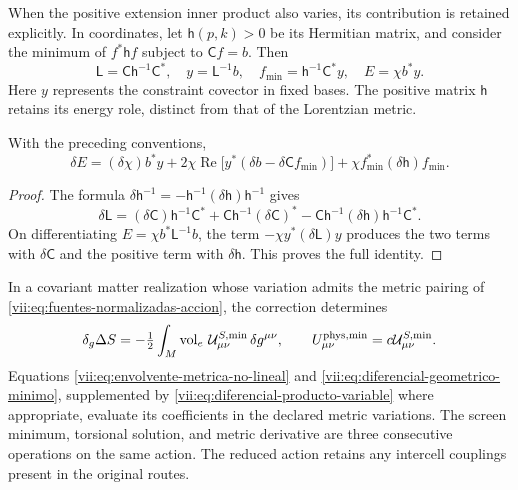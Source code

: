 When the positive extension inner product also varies, its
contribution is retained explicitly. In coordinates, let
\(\mathsf h(p,k)>0\) be its Hermitian matrix, and consider the
minimum of \(f^*\mathsf h f\) subject to \(\mathsf C f=b\). Then
\begin{equation}
 \mathsf L=\mathsf C\mathsf h^{-1}\mathsf C^*,\quad
 y=\mathsf L^{-1}b,\quad
 f_{\min}=\mathsf h^{-1}\mathsf C^*y,\quad
 E=\chi b^*y.
 \label{vii:eq:minimo-producto-variable}
\end{equation}
Here \(y\) represents the constraint covector in fixed bases.
The positive matrix \(\mathsf h\) retains its energy role,
distinct from that of the Lorentzian metric.

\begin{lemma}
\label{vii:lem:producto-variable-extension}
With the preceding conventions,
\begin{equation}
 \delta E=(\delta\chi)b^*y
   +2\chi\operatorname{Re}\bigl[y^*(\delta b-\delta\mathsf C f_{\min})\bigr]
   +\chi f_{\min}^*(\delta\mathsf h)f_{\min}.
 \label{vii:eq:diferencial-producto-variable}
\end{equation}
\end{lemma}
\begin{proof}
The formula \(\delta\mathsf h^{-1}
=-\mathsf h^{-1}(\delta\mathsf h)\mathsf h^{-1}\) gives
\[
 \delta\mathsf L=(\delta\mathsf C)\mathsf h^{-1}\mathsf C^*
 +\mathsf C\mathsf h^{-1}(\delta\mathsf C)^*
 -\mathsf C\mathsf h^{-1}(\delta\mathsf h)
                              \mathsf h^{-1}\mathsf C^*.
\]
On differentiating \(E=\chi b^*\mathsf L^{-1}b\), the term
\(-\chi y^*(\delta\mathsf L)y\) produces the two terms
with \(\delta\mathsf C\) and the positive term with
\(\delta\mathsf h\). This proves the full identity.
\end{proof}

In a covariant matter realization whose variation admits the metric
pairing of
\eqref{vii:eq:fuentes-normalizadas-accion}, the correction determines
\begin{equation}
 \delta_g\Delta S
 =-\tfrac12\int_M\operatorname{vol}_e\,
          \mathcal U^{S,\min}_{\mu\nu}\,\delta g^{\mu\nu},
 \qquad U^{\rm phys,\min}_{\mu\nu}
                      =c\mathcal U^{S,\min}_{\mu\nu}.
 \label{vii:eq:fuente-metrica-minimo-no-lineal}
\end{equation}
Equations \eqref{vii:eq:envolvente-metrica-no-lineal} and
\eqref{vii:eq:diferencial-geometrico-minimo}, supplemented by
\eqref{vii:eq:diferencial-producto-variable} where appropriate,
evaluate its coefficients in the declared metric variations.
The screen minimum, torsional solution, and metric derivative are
three consecutive operations on the same action. The reduced action
retains any intercell couplings present in the original routes.

